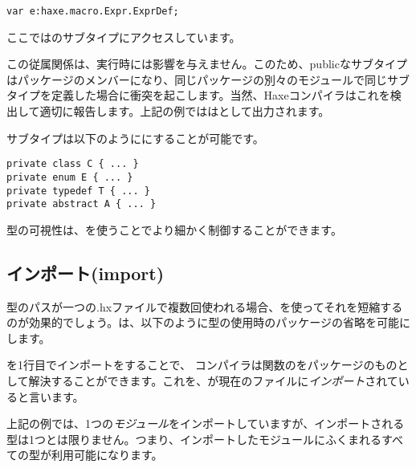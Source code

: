 \begin{lstlisting}
var e:haxe.macro.Expr.ExprDef;
\end{lstlisting}

ここではのサブタイプにアクセスしています。

この従属関係は、実行時には影響を与えません。このため、publicなサブタイプはパッケージのメンバーになり、同じパッケージの別々のモジュールで同じサブタイプを定義した場合に衝突を起こします。当然、Haxeコンパイラはこれを検出して適切に報告します。上記の例でははとして出力されます。

サブタイプは以下のようににすることが可能です。

\begin{lstlisting}
private class C { ... }
private enum E { ... }
private typedef T { ... }
private abstract A { ... }
\end{lstlisting}


型の可視性は、を使うことでより細かく制御することができます。

\subsection{インポート(import)}
\label{type-system-import}

型のパスが一つの.hxファイルで複数回使われる場合、を使ってそれを短縮するのが効果的でしょう。は、以下のように型の使用時のパッケージの省略を可能にします。


を1行目でインポートをすることで、 コンパイラは関数のをパッケージのものとして解決することができます。これを、が現在のファイルに\emph{インポート}されていると言います。

上記の例では、1つの\emph{モジュール}をインポートしていますが、インポートされる型は1つとは限りません。つまり、インポートしたモジュールにふくまれるすべての型が利用可能になります。


